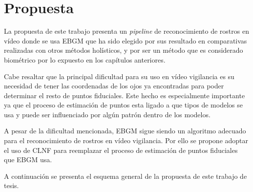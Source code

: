\chapter{Propuesta} \label{chap:Propuesta}

La propuesta de este trabajo presenta un \textit{pipeline} de reconocimiento de rostros en vídeo donde se usa \ac{EBGM} que ha sido elegido por sus resultado en comparativas realizadas con otros métodos holísticos, y por ser un método que es considerado biométrico por lo expuesto en los capítulos anteriores.

Cabe resaltar que la principal dificultad para su uso en vídeo vigilancia es su necesidad de tener las coordenadas de los ojos ya encontradas para poder determinar el resto de puntos fiduciales. Este hecho es especialmente importante ya que el proceso de estimación de puntos esta ligado a que tipos de modelos se usa y puede ser influenciado por algún patrón dentro de los modelos.

A pesar de la dificultad mencionada, \ac{EBGM} sigue siendo un algoritmo adecuado para el reconocimiento de rostros en vídeo vigilancia. Por ello se propone adoptar el uso de \ac{CLNF} para reemplazar el proceso de estimación de puntos fiduciales que \ac{EBGM} usa.

A continuación se presenta el esquema general de la propuesta de este trabajo de tesis.

